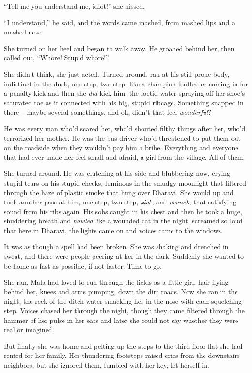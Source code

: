 ``Tell me you understand me, idiot!'' she hissed.

``I understand,'' he said, and the words came mashed, from mashed
lips and a mashed nose.

She turned on her heel and began to walk away. He groaned behind
her, then called out, ``Whore! Stupid whore!''

She didn't think, she just acted. Turned around, ran at his
still-prone body, indistinct in the dusk, one step, two step, like
a champion footballer coming in for a penalty kick and then she
\emph{did} kick him, the foetid water spraying off her shoe's
saturated toe as it connected with his big, stupid ribcage.
Something snapped in there -- maybe several somethings, and oh,
didn't that feel \emph{wonderful}?

He was every man who'd scared her, who'd shouted filthy things
after her, who'd terrorized her mother. He was the bus driver who'd
threatened to put them out on the roadside when they wouldn't pay
him a bribe. Everything and everyone that had ever made her feel
small and afraid, a girl from the village. All of them.

She turned around. He was clutching at his side and blubbering now,
crying stupid tears on his stupid cheeks, luminous in the smudgy
moonlight that filtered through the haze of plastic smoke that hung
over Dharavi. She would up and took another pass at him, one step,
two step, \emph{kick}, and \emph{crunch}, that satisfying sound
from his ribs again. His sobs caught in his chest and then he took
a huge, shuddering breath and \emph{howled} like a wounded cat in
the night, screamed so loud that here in Dharavi, the lights came
on and voices came to the windows.

It was as though a spell had been broken. She was shaking and
drenched in sweat, and there were people peering at her in the
dark. Suddenly she wanted to be home as fast as possible, if not
faster. Time to go.

She ran. Mala had loved to run through the fields as a little girl,
hair flying behind her, knees and arms pumping, down the dirt
roads. Now she ran in the night, the reek of the ditch water
smacking her in the nose with each squelching step. Voices chased
her through the night, though they came filtered through the hammer
of her pulse in her ears and later she could not say whether they
were real or imagined.

But finally she was home and pelting up the steps to the
third-floor flat she had rented for her family. Her thundering
footsteps raised cries from the downstairs neighbors, but she
ignored them, fumbled with her key, let herself in.

